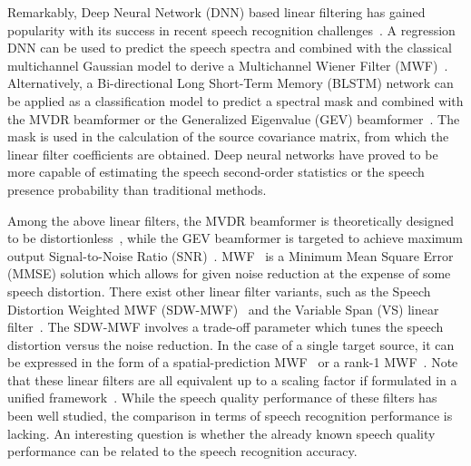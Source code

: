 \documentclass[review]{elsarticle}
\begin{document}
Remarkably, Deep Neural Network (DNN) based linear filtering has gained popularity with its success in recent speech recognition challenges~\cite{2015inriaCHiME3,2016arieCHiME,2015blstmCHiME3,2016lstmCHiME4}. A regression DNN can be used to predict the speech spectra and combined with the classical multichannel Gaussian model to derive a Multichannel Wiener Filter (MWF)~\cite{2015inriaCHiME3,2016arieCHiME}. Alternatively, a Bi-directional Long Short-Term Memory (BLSTM) network can be applied as a classification model to predict a spectral mask and combined with the MVDR beamformer or the Generalized Eigenvalue (GEV) beamformer~\cite{2015blstmCHiME3,2016lstmCHiME4}. The mask is used in the calculation of the source covariance matrix, from which the linear filter coefficients are obtained. Deep neural networks have proved to be more capable of estimating the speech second-order statistics or the speech presence probability than traditional methods.

Among the above linear filters, the MVDR beamformer is theoretically designed to be distortionless~\cite{1987MVDR}, while the GEV beamformer is targeted to achieve maximum output Signal-to-Noise Ratio (SNR)~\cite{2007GEV}. MWF~\cite{2002MWF} is a Minimum Mean Square Error (MMSE) solution which allows for given noise reduction at the expense of some speech distortion. There exist other linear filter variants, such as the Speech Distortion Weighted MWF (SDW-MWF)~\cite{2004sdwmwf,2007sdwmwf2,2014serizellow} and the Variable Span (VS) linear filter~\cite{2016vsfilter}. The SDW-MWF involves a trade-off parameter which tunes the speech distortion versus the noise reduction. In the case of a single target source, it can be expressed in the form of a spatial-prediction MWF~\cite{2008spMWF} or a rank-1 MWF~\cite{2010r1MWF}. Note that these linear filters are all equivalent up to a scaling factor if formulated in a unified framework~\cite{2016vsfilter,2013benestyNRtime,2016consolidated}. While the speech quality performance of these filters has been well studied, the comparison in terms of speech recognition performance is lacking. An interesting question is whether the already known speech quality performance can be related to the speech recognition accuracy.
\end{document}
